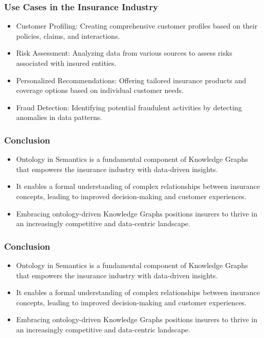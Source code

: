 \begin{frame}[fragile]
\frametitle{Use Cases in the Insurance Industry}
\begin{itemize}
\item Customer Profiling: Creating comprehensive customer profiles based on their policies, claims, and interactions.
\item Risk Assessment: Analyzing data from various sources to assess risks associated with insured entities.
\item Personalized Recommendations: Offering tailored insurance products and coverage options based on individual customer needs.
\item Fraud Detection: Identifying potential fraudulent activities by detecting anomalies in data patterns.
\end{itemize}
\end{frame}

\begin{frame}[fragile]
\frametitle{Conclusion}
\begin{itemize}
\item Ontology in Semantics is a fundamental component of Knowledge Graphs that empowers the insurance industry with data-driven insights.
\item It enables a formal understanding of complex relationships between insurance concepts, leading to improved decision-making and customer experiences.
\item Embracing ontology-driven Knowledge Graphs positions insurers to thrive in an increasingly competitive and data-centric landscape.
\end{itemize}
\end{frame}

\begin{frame}[fragile]
\frametitle{Conclusion}
\begin{itemize}
\item Ontology in Semantics is a fundamental component of Knowledge Graphs that empowers the insurance industry with data-driven insights.
\item It enables a formal understanding of complex relationships between insurance concepts, leading to improved decision-making and customer experiences.
\item Embracing ontology-driven Knowledge Graphs positions insurers to thrive in an increasingly competitive and data-centric landscape.
\end{itemize}
\end{frame}


